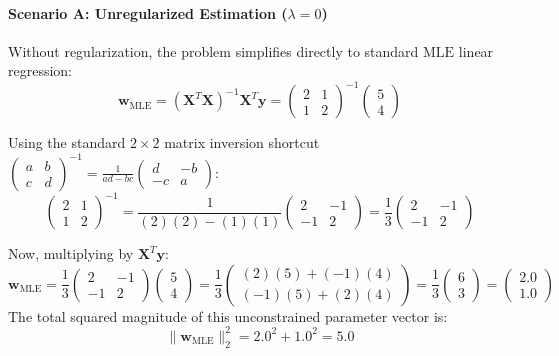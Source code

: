 \documentclass{article}
\begin{document}
\paragraph{Scenario A: Unregularized Estimation ($\lambda = 0$)}
Without regularization, the problem simplifies directly to standard $\text{MLE}$ linear regression:
\begin{equation}
\mathbf{w}_{\text{MLE}} = (\mathbf{X}^T\mathbf{X})^{-1}\mathbf{X}^T\mathbf{y} = \begin{pmatrix} 2 & 1 \\ 1 & 2 \end{pmatrix}^{-1} \begin{pmatrix} 5 \\ 4 \end{pmatrix}
\end{equation}

Using the standard $2 \times 2$ matrix inversion shortcut $\begin{pmatrix} a & b \\ c & d \end{pmatrix}^{-1} = \frac{1}{ad-bc}\begin{pmatrix} d & -b \\ -c & a \end{pmatrix}$:
\begin{equation}
\begin{pmatrix} 2 & 1 \\ 1 & 2 \end{pmatrix}^{-1} = \frac{1}{(2)(2) - (1)(1)}\begin{pmatrix} 2 & -1 \\ -1 & 2 \end{pmatrix} = \frac{1}{3}\begin{pmatrix} 2 & -1 \\ -1 & 2 \end{pmatrix}
\end{equation}

Now, multiplying by $\mathbf{X}^T\mathbf{y}$:
\begin{equation}
\mathbf{w}_{\text{MLE}} = \frac{1}{3}\begin{pmatrix} 2 & -1 \\ -1 & 2 \end{pmatrix} \begin{pmatrix} 5 \\ 4 \end{pmatrix} = \frac{1}{3}\begin{pmatrix} (2)(5) + (-1)(4) \\ (-1)(5) + (2)(4) \end{pmatrix} = \frac{1}{3}\begin{pmatrix} 6 \\ 3 \end{pmatrix} = \begin{pmatrix} 2.0 \\ 1.0 \end{pmatrix}
\end{equation}
The total squared magnitude of this unconstrained parameter vector is:
\begin{equation}
\|\mathbf{w}_{\text{MLE}}\|_2^2 = 2.0^2 + 1.0^2 = 5.0
\end{equation}
\end{document}
